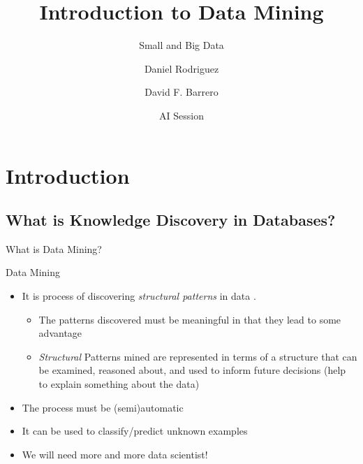 \documentclass{beamer}
\title[Intruction to Data Mining] %
{Introduction to Data Mining}
\subtitle
{Small and Big Data}
\author[]
{
  Daniel Rodriguez %
  \and David F. Barrero
}
\institute[Univ of Alcala]
{
  University of Alcala, Spain
}
\date[] %
{AI Session}
\begin{document}
\maketitle


\section{Introduction}

\subsection{What is Knowledge Discovery in Databases?}

\begin{frame}{What is Data Mining?}



\begin{block}{Data Mining}
\begin{itemize}
 \item It is process of discovering \textit{structural patterns} in data \cite{WFH11}. %
    \begin{itemize}
      \item The \alert{patterns} discovered must be meaningful in that they lead to some advantage
      \item \emph{Structural} Patterns mined are represented in terms of a structure that can be
examined, reasoned about, and used to inform future decisions (help to explain something about the data)
      
    \end{itemize}
    \item The process must be (semi)automatic
    \item It can be used to classify/predict unknown examples
    \item We will need more and more \alert{data scientist}!
\end{itemize}
\end{block}


\end{frame}
\end{document}
